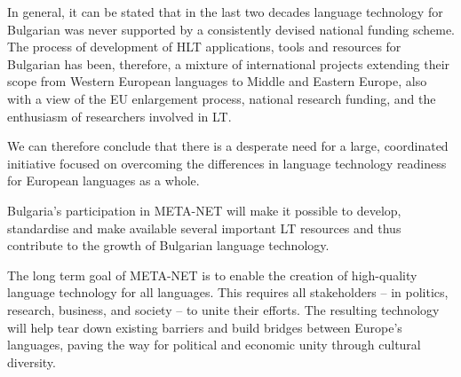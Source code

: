 \documentclass[]{../../metanetpaper}
\begin{document}
\begin{multicols}{2}
In general, it can be stated that in the last two decades language technology for Bulgarian was never supported by a consistently devised national funding scheme. The process of development of HLT applications, tools and resources for Bulgarian has been, therefore, a mixture of international projects extending their scope from Western European languages to Middle and Eastern Europe, also with a view of the EU enlargement process, national research funding, and the enthusiasm of researchers involved in LT.
\columnbreak

We can therefore conclude that there is a desperate need for a large, coordinated initiative focused on overcoming the differences in language technology readiness for European languages as a whole. 

Bulgaria’s participation in
META-NET will make it possible to develop, standardise and make
available several important LT resources and thus contribute to the
growth of Bulgarian language technology.

The long term goal of META-NET is to enable the creation of high-quality language technology for all languages. This requires all stakeholders -- in politics, research, business, and society -- to unite their efforts. The resulting technology will help tear down existing barriers and build bridges between Europe’s languages, paving the way for political and economic unity through cultural diversity. 
\end{multicols}

\clearpage
\end{document}
